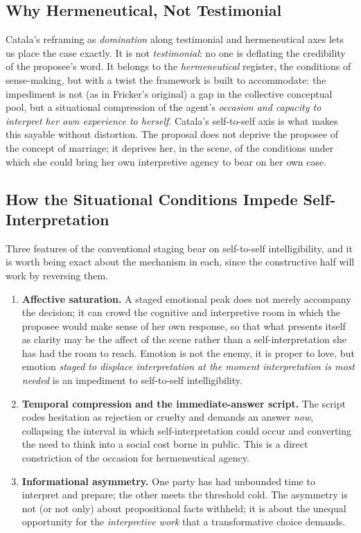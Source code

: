 \subsection{Why Hermeneutical, Not Testimonial}

Catala's reframing as \emph{domination} along testimonial and hermeneutical axes lets us place the case exactly. It is not \emph{testimonial}: no one is deflating the credibility of the proposee's word. It belongs to the \emph{hermeneutical} register, the conditions of sense-making, but with a twist the framework is built to accommodate: the impediment is not (as in Fricker's original) a gap in the collective conceptual pool, but a situational compression of the agent's \emph{occasion and capacity to interpret her own experience to herself}. Catala's self-to-self axis is what makes this sayable without distortion. The proposal does not deprive the proposee of the concept of marriage; it deprives her, in the scene, of the conditions under which she could bring her own interpretive agency to bear on her own case.

\subsection{How the Situational Conditions Impede Self-Interpretation}

Three features of the conventional staging bear on self-to-self intelligibility, and it is worth being exact about the mechanism in each, since the constructive half will work by reversing them.

\begin{enumerate}
\item \textbf{Affective saturation.} A staged emotional peak does not merely accompany the decision; it can crowd the cognitive and interpretive room in which the proposee would make sense of her own response, so that what presents itself as clarity may be the affect of the scene rather than a self-interpretation she has had the room to reach. Emotion is not the enemy, it is proper to love, but emotion \emph{staged to displace interpretation at the moment interpretation is most needed} is an impediment to self-to-self intelligibility.
\item \textbf{Temporal compression and the immediate-answer script.} The script codes hesitation as rejection or cruelty and demands an answer \emph{now}, collapsing the interval in which self-interpretation could occur and converting the need to think into a social cost borne in public. This is a direct constriction of the occasion for hermeneutical agency.
\item \textbf{Informational asymmetry.} One party has had unbounded time to interpret and prepare; the other meets the threshold cold. The asymmetry is not (or not only) about propositional facts withheld; it is about the unequal opportunity for the \emph{interpretive work} that a transformative choice demands.
\end{enumerate}

